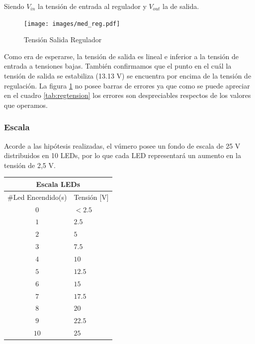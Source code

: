 \documentclass[12pt,a4paper]{article}
\begin{document}
			Siendo $V_{in}$ la tensión de entrada al regulador y $V_{out}$ la de salida.

			\begin{figure}[H]
			\centering
				\texttt{[image: images/med\_reg.pdf]}\caption{Tensión Salida Regulador}\label{fig:grafreg}
			\end{figure}

			Como era de esperarse, la tensión de salida es lineal e inferior a la tensión de entrada a tensiones bajas. También confirmamos que el punto en el cuál la tensión de salida se estabiliza (13.13 V) se encuentra por encima de la tensión de regulación. La figura \ref{fig:grafreg} no posee barras de errores ya que como se puede apreciar en el cuadro \ref{tab:regtension} los errores son despreciables respectos de los valores que operamos.

			\subsubsection{Escala}
				Acorde a las hipótesis realizadas, el vúmero posee un fondo de escala de 25 V distribuidos en 10 LEDs, por lo que cada LED representará un aumento en la tensión de 2,5 V. 

				\begin{center}
			{\footnotesize \begin{tabular}{ |c|l| }

			\hline
				\multicolumn{2}{|c|}{\textbf{Escala LEDs}}\\ \hline
				$\#$Led Encendido(s) & Tensión [V] \\ \hline
				$0$ & $< 2.5$ \\ \hline
				$1$ & $2.5$ \\ \hline
				$2$ & $5$ \\ \hline
				$3$ & $7.5$ \\ \hline
				$4$ & $10$ \\ \hline
				$5$ & $12.5$ \\ \hline
				$6$ & $15$ \\ \hline
				$7$ & $17.5$ \\ \hline
				$8$ & $20$ \\ \hline
				$9$ & $22.5$ \\ \hline
				$10$ & $25$ \\ \hline			
 				
				
			\end{tabular}}\label{tab:escala}
			\end{center}
\end{document}
